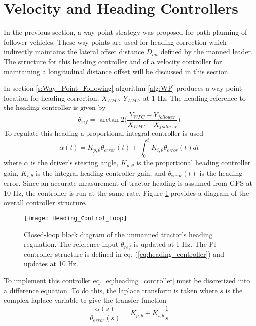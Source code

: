 \section{Velocity and Heading Controllers}
\label{s:Velocity_and_Heading_Controllers}
In the previous section, a way point strategy was proposed for path planning of follower vehicles. These way points are used for heading correction which indirectly maintains the lateral offset distance $D_{lat}$ defined by the manned leader. The structure for this heading controller and of a velocity controller for maintaining a longitudinal distance offset will be discussed in this section. 

In section \ref{s:Way_Point_Following} algorithm \ref{alg:WP} produces a way point location for heading correction, $X_{WPC}$, $Y_{WPC}$, at 1 Hz. The heading reference to the heading controller is given by 
\begin{equation}\label{eq:heading_reference}
        \theta_{ref} = \arctan2\Bigg(\frac{Y_{WPC}-Y_{follower}}{X_{WPC}-X_{follower}}\Bigg)
\end{equation}
To regulate this heading a proportional integral controller is used
\begin{equation}\label{eq:heading_controller}
        \alpha(t) = K_{p,\theta}\theta_{error}(t) + \int_{0}^{t}K_{i,\theta}\theta_{error}(t)dt
\end{equation}
where  $\alpha$ is the driver's steering angle, $K_{p,\theta}$ is the proportional heading controller gain, $K_{i,\theta}$ is the integral heading controller gain, and $\theta_{error}(t)$ is the heading error. Since an accurate measurement of tractor heading is assumed from GPS at 10 Hz, the controller is run at the same rate. Figure \ref{fig:Heading_Control_Loop} provides a diagram of the overall controller structure.
\begin{figure}[htb]
    \centering
    \texttt{[image: Heading\_Control\_Loop]}
    \caption{Closed-loop block diagram of the unmanned tractor's heading regulation. The reference input $\theta_{ref}$ is updated at 1 Hz. The PI controller structure is defined in eq. (\ref{eq:heading_controller}) and updates at 10 Hz.}
    \label{fig:Heading_Control_Loop}
\end{figure}
To implement this controller eq. \ref{eq:heading_controller} must be discretized into a difference equation. To do this, the laplace transform is taken where $s$ is the complex laplace variable to give the transfer function
\begin{equation}\label{eq:heading_controller_ctf}
        \frac{\alpha(s)}{\theta_{error}(s)} = K_{p,\theta} + K_{i,\theta}\frac{1}{s}
\end{equation}

